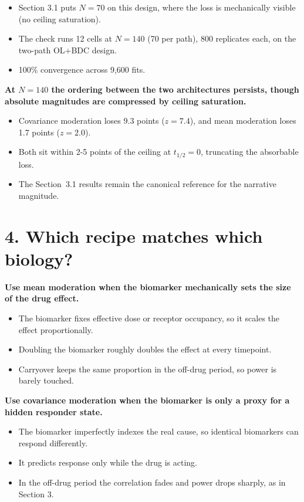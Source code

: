\documentclass[
  11pt,
]{article}
\begin{document}
\begin{itemize}\setlength{\itemsep}{2pt}\setlength{\parskip}{0pt}
\item Section 3.1 puts $N = 70$ on this design, where the loss is
mechanically visible (no ceiling saturation).
\item The check runs 12 cells at $N = 140$ (70 per path), 800
replicates each, on the two-path OL+BDC design.
\item 100\% convergence across 9{,}600 fits.
\end{itemize}

\textbf{At $N = 140$ the ordering between the two architectures
persists, though absolute magnitudes are compressed by ceiling
saturation.}

\begin{itemize}\setlength{\itemsep}{2pt}\setlength{\parskip}{0pt}
\item Covariance moderation loses 9.3 points ($z = 7.4$), and mean
moderation loses 1.7 points ($z = 2.0$).
\item Both sit within 2-5 points of the ceiling at $t_{1/2} = 0$,
truncating the absorbable loss.
\item The Section~3.1 results remain the canonical reference for
the narrative magnitude.
\end{itemize}

\section{4. Which recipe matches which biology?}

\textbf{Use mean moderation when the biomarker mechanically sets the
size of the drug effect.}

\begin{itemize}\setlength{\itemsep}{2pt}\setlength{\parskip}{0pt}
\item The biomarker fixes effective dose or receptor occupancy, so
it scales the effect proportionally.
\item Doubling the biomarker roughly doubles the effect at every
timepoint.
\item Carryover keeps the same proportion in the off-drug period, so power is
barely touched.
\end{itemize}

\textbf{Use covariance moderation when the biomarker is only a proxy for a
hidden responder state.}

\begin{itemize}\setlength{\itemsep}{2pt}\setlength{\parskip}{0pt}
\item The biomarker imperfectly indexes the real cause, so identical
biomarkers can respond differently.
\item It predicts response only while the drug is acting.
\item In the off-drug period the correlation fades and power drops sharply, as
in Section 3.
\end{itemize}
\end{document}
